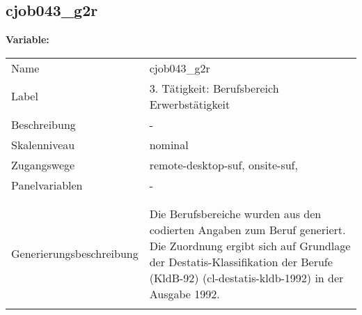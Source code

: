	
	
	\subsection{cjob043\_g2r}
	\label{subSection:cjob043_g2r}

	\noindent\textbf{Variable:}\\
		\begin{tabular}{lL{11.3cm}}
			\label{tableVariable:cjob043_g2r}
			Name & cjob043\_g2r \\
			Label & 3. Tätigkeit: Berufsbereich Erwerbstätigkeit \\
			Beschreibung & - \\
			Skalenniveau & nominal \\
			Zugangswege &
				remote-desktop-suf,
				onsite-suf,
 \\
			Panelvariablen & -
			 \\
			 \\
 \\
					Generierungsbeschreibung & Die Berufsbereiche wurden aus den codierten Angaben zum Beruf generiert. Die Zuordnung ergibt sich auf Grundlage der Destatis-Klassifikation der Berufe (KldB-92) (cl-destatis-kldb-1992) in der Ausgabe 1992. 
				 \\	
			 \\
		\end{tabular}







